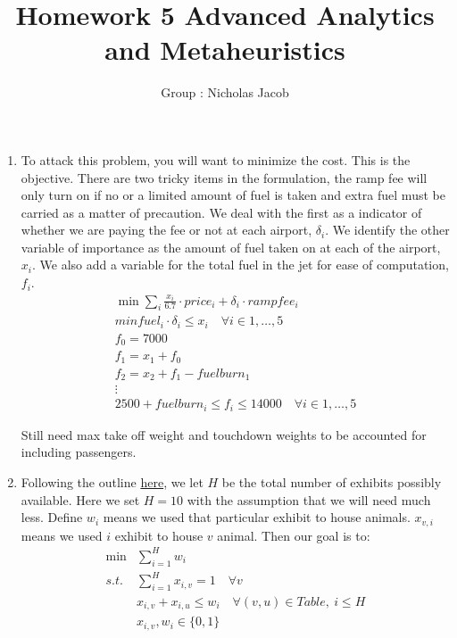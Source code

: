 \documentclass[11pt]{article}
\author{Group : Nicholas Jacob}
\title{Homework 5 Advanced Analytics and Metaheuristics}
\begin{document}
\maketitle

\begin{enumerate}
\item To attack this problem, you will want to minimize the cost.  This is the objective.  There are two tricky items in the formulation, the ramp fee will only turn on if no or a limited amount of fuel is taken and extra fuel must be carried as a matter of precaution.  We deal with the first as a indicator of whether we are paying the fee or not at each airport, $\delta_i$.  We identify the other variable of importance as the amount of fuel taken on at each of the airport, $x_i$.  We also add a variable for the total fuel in the jet for ease of computation, $f_i$.
\begin{eqnarray}
\min \sum_{i}\frac{x_i}{6.7}\cdot price_i + \delta_i\cdot rampfee_i\\
minfuel_i\cdot\delta_i\leq x_i\quad \forall i\in {1,\dots ,5}\\
f_0 = 7000\\
f_1 = x_1 + f_0\\
f_2 = x_2 + f_1 - fuelburn_1\\
\vdots\\
2500 + fuelburn_i \leq f_i \leq 14000\quad \forall i \in {1,\dots ,5}
\end{eqnarray}

Still need max take off weight and touchdown weights to be accounted for including passengers.

\item Following the outline \href{https://math.stackexchange.com/questions/4594715/vertex-coloring-approximation-algorithm-using-linear-programming}{here}, 
we let $H$ be the total number of exhibits possibly available.  Here we set $H = 10$ with the assumption that we will need much less. Define $w_i$ means we used that particular exhibit to house animals.  $x_{v,i}$ means we used $i$ exhibit to house $v$ animal.  Then our goal is to:
\begin{eqnarray}
\min &\sum_{i=1}^H w_i\\
s.t.& \sum_{i=1}^Hx_{i,v} = 1\quad \forall v\\
& x_{i,v} + x_{i,u} \leq w_i\quad \forall (v,u)\in Table, \ i\leq H\\
&x_{i,v},w_i\in \{0,1\}
\end{eqnarray}

\end{enumerate}
\end{document}
